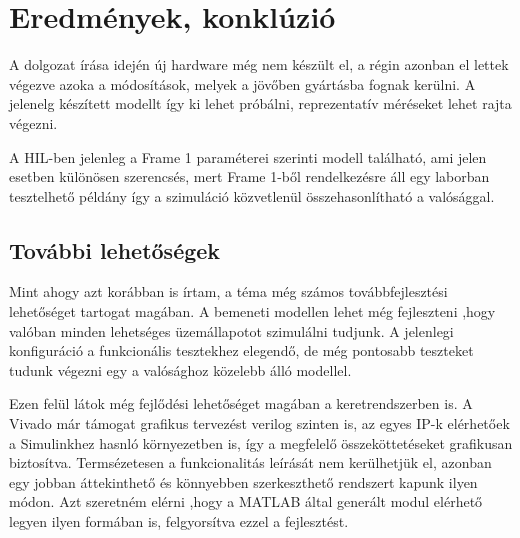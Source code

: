 \chapter{Eredmények, konklúzió}

A dolgozat írása idején új hardware még nem készült el, a régin azonban el lettek végezve azoka a módosítások, melyek a jövőben gyártásba fognak kerülni. A jelenelg készített modellt így ki lehet próbálni, reprezentatív méréseket lehet rajta végezni.

A HIL-ben jelenleg a Frame 1 paraméterei szerinti modell található, ami jelen esetben különösen szerencsés, mert Frame 1-ből rendelkezésre áll egy laborban tesztelhető példány így a szimuláció közvetlenül összehasonlítható a valósággal.

\section{További lehetőségek}

Mint ahogy azt korábban is írtam, a téma még számos továbbfejlesztési lehetőséget tartogat magában. A bemeneti modellen lehet még fejleszteni ,hogy valóban minden lehetséges üzemállapotot szimulálni tudjunk. A jelenlegi konfiguráció a funkcionális tesztekhez elegendő, de még pontosabb teszteket tudunk végezni egy a valósághoz közelebb álló modellel.

Ezen felül látok még fejlődési lehetőséget magában a keretrendszerben is. A Vivado már támogat grafikus tervezést verilog szinten is, az egyes IP-k elérhetőek a Simulinkhez hasnló környezetben is, így a megfelelő összeköttetéseket grafikusan biztosítva. Termsézetesen a funkcionalitás leírását nem kerülhetjük el, azonban egy jobban áttekinthető és könnyebben szerkeszthető rendszert kapunk ilyen módon. Azt szeretném elérni ,hogy a MATLAB által generált modul elérhető legyen ilyen formában is, felgyorsítva ezzel a fejlesztést.
